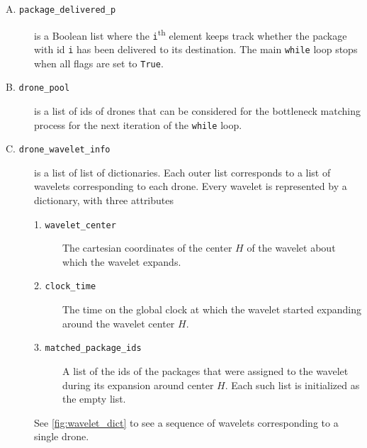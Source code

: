 \documentclass[10pt, english, oneside]{report}
\begin{document}
\begin{description}
\item[A. \texttt{package\_delivered\_p}] is a Boolean list
       where the \verb|i|\textsuperscript{th} element keeps track whether 
       the package with id \verb|i| has been delivered to its destination. 
       The main \verb|while| loop stops when all flags are set to \verb|True|. 
     
\item[B. \texttt{drone\_pool}] is a list of ids of drones that can be 
     considered for the bottleneck matching process for the next iteration of 
     the \verb|while| loop.  

\item[C. \texttt{drone\_wavelet\_info}] is a list of list of dictionaries. Each outer list 
     corresponds to a list of wavelets corresponding to each drone. Every wavelet is represented
     by a dictionary, with three attributes
     
\begin{description}
  \item[1. \texttt{wavelet\_center}] The cartesian coordinates of the center $H$ of the 
          wavelet about which the wavelet expands.
  \item[2. \texttt{clock\_time}] The time on the global clock at which the wavelet started expanding around the 
         wavelet center $H$.
  \item[3. \texttt{matched\_package\_ids}] A list of the ids of the packages that were assigned to the wavelet 
     during its expansion around center $H$. Each such list is initialized as the empty list. 
\end{description}
     
     See \autoref{fig:wavelet_dict} to see a sequence of wavelets corresponding 
     to a single drone.   


\end{description}
\end{document}
